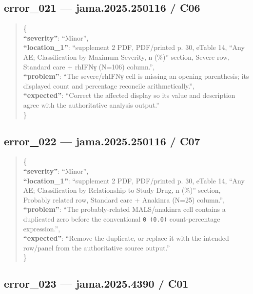 \documentclass[
  letterpaper,
  9pt]{extreport}
\begin{document}
\hypertarget{error_021--jama2025250116--c06}{%
\subsection{error\_021 --- jama.2025.250116 /
C06}\label{error_021--jama2025250116--c06}}

\begin{quote}
\{\\
\textbf{``severity''}: ``Minor'',\\
\textbf{``location\_1''}: ``supplement 2 PDF, PDF/printed p. 30, eTable
14, ``Any AE; Classification by Maximum Severity, n (\%)'' section,
Severe row, Standard care + rhIFNγ (N=106) column.'',\\
\textbf{``problem''}: ``The severe/rhIFNγ cell is missing an opening
parenthesis; its displayed count and percentage reconcile
arithmetically.'',\\
\textbf{``expected''}: ``Correct the affected display so its value and
description agree with the authoritative analysis output.''\\
\}
\end{quote}

\hypertarget{error_022--jama2025250116--c07}{%
\subsection{error\_022 --- jama.2025.250116 /
C07}\label{error_022--jama2025250116--c07}}

\begin{quote}
\{\\
\textbf{``severity''}: ``Minor'',\\
\textbf{``location\_1''}: ``supplement 2 PDF, PDF/printed p. 30, eTable
14, ``Any AE; Classification by Relationship to Study Drug, n (\%)''
section, Probably related row, Standard care + Anakinra (N=25)
column.'',\\
\textbf{``problem''}: ``The probably-related MALS/anakinra cell contains
a duplicated zero before the conventional \texttt{0\ (0.0)}
count-percentage expression.'',\\
\textbf{``expected''}: ``Remove the duplicate, or replace it with the
intended row/panel from the authoritative source output.''\\
\}
\end{quote}

\hypertarget{error_023--jama20254390--c01}{%
\subsection{error\_023 --- jama.2025.4390 /
C01}\label{error_023--jama20254390--c01}}
\end{document}
